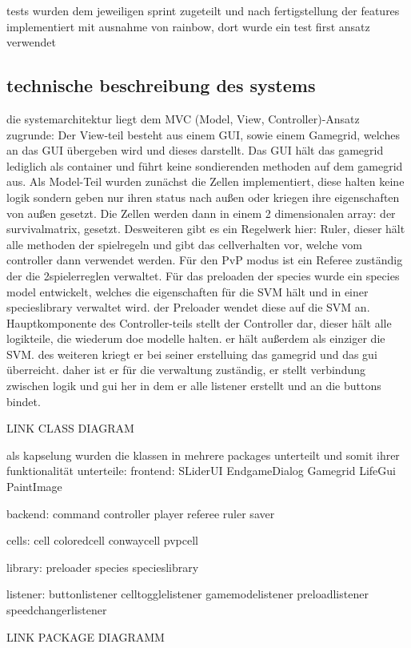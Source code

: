 \documentclass[12pt]{article}
\theoremstyle{plain}
\begin{document}
tests wurden dem jeweiligen sprint zugeteilt und nach fertigstellung der features implementiert
mit ausnahme von rainbow, dort wurde ein test first ansatz verwendet

\subsection{technische beschreibung des systems}

die systemarchitektur liegt dem MVC (Model, View, Controller)-Ansatz zugrunde:
Der View-teil besteht aus einem GUI, sowie einem Gamegrid, welches an das GUI übergeben wird und dieses darstellt.
Das GUI hält das gamegrid lediglich als container und führt keine sondierenden methoden auf dem gamegrid aus.
Als Model-Teil wurden zunächst die Zellen implementiert, diese halten keine logik sondern geben nur ihren status nach außen oder kriegen ihre eigenschaften
von außen gesetzt. Die Zellen werden dann in einem 2 dimensionalen array: der survivalmatrix, gesetzt. Desweiteren gibt es ein Regelwerk hier: Ruler,
dieser hält alle methoden der spielregeln und gibt das cellverhalten vor, welche vom controller dann verwendet werden. Für den PvP modus ist ein Referee zuständig der die 2spielerreglen
verwaltet. Für das preloaden der species wurde ein species model entwickelt, welches die eigenschaften für die SVM hält und in einer specieslibrary verwaltet wird. der Preloader wendet diese auf die SVM an.
Hauptkomponente des Controller-teils stellt der Controller dar, dieser hält alle logikteile, die wiederum doe modelle halten. er hält außerdem als einziger die SVM.
des weiteren kriegt er bei seiner erstelluing das gamegrid und das gui überreicht. daher ist er für die verwaltung zuständig, er stellt verbindung zwischen logik und gui her in dem
er alle listener erstellt und an die buttons bindet.


LINK CLASS DIAGRAM

als kapselung wurden die klassen in mehrere packages unterteilt und somit ihrer funktionalität unterteile:
frontend:
SLiderUI
EndgameDialog
Gamegrid
LifeGui
PaintImage

backend:
command
controller
player
referee
ruler
saver

cells:
cell
coloredcell
conwaycell
pvpcell

library:
preloader
species
specieslibrary

listener:
buttonlistener
celltogglelistener
gamemodelistener
preloadlistener
speedchangerlistener


LINK PACKAGE DIAGRAMM
\end{document}
